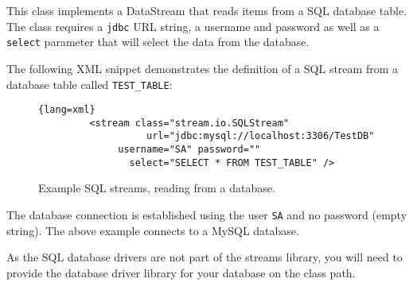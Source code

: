 
This class implements a DataStream that reads items from a SQL database
table. The class requires a \texttt{jdbc} URL string, a username and
password as well as a \texttt{select} parameter that will select the
data from the database.

The following XML snippet demonstrates the definition of a SQL stream
from a database table called \texttt{TEST\_TABLE}:
\begin{figure}[h!]
     \begin{lstlisting}{lang=xml}
         <stream class="stream.io.SQLStream"
                   url="jdbc:mysql://localhost:3306/TestDB"
              username="SA" password=""
                select="SELECT * FROM TEST_TABLE" />
     \end{lstlisting}
     \caption{\label{fig:exampleSQLStream}Example SQL streams, reading from a database.}
\end{figure}
The database connection is established using the user \texttt{SA} and no
password (empty string). The above example connects to a MySQL database.

As the SQL database drivers are not part of the streams library, you
will need to provide the database driver library for your database on
the class path.

\begin{table}[h]
\end{table}
